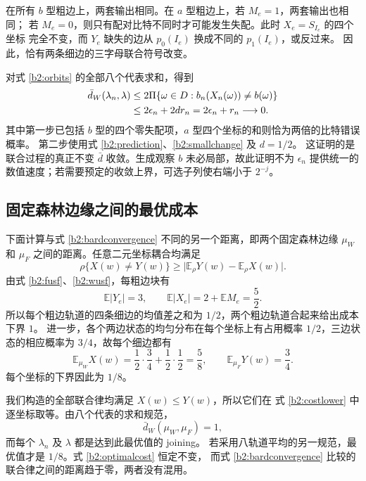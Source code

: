 \documentclass[UTF8,zihao=-4,a4paper]{ctexart}
\numberwithin{equation}{section}
\newcommand{\EE}{\mathbb E}
\begin{document}
在所有 $b$ 型粗边上，两套输出相同。在 $a$ 型粗边上，若 $M_e=1$，两套输出也相同；
若 $M_e=0$，则只有配对比特不同时才可能发生失配。此时 $X_e=S_{I_e}$ 的四个坐标
完全不变，而 $Y_e$ 缺失的边从 $p_0(I_e)$ 换成不同的 $p_1(I_e)$，或反过来。
因此，恰有两条细边的三字母联合符号改变。

对式 \eqref{b2:orbits} 的全部八个代表求和，得到
\begin{align}
 \bar d_W(\lambda_n,\lambda)
 &\le2\Pi\{\omega\in D:b_n(X_n(\omega))\ne b(\omega)\}\notag\\
 &\le2\epsilon_n+2dr_n
 =2\epsilon_n+r_n\longrightarrow0.
 \label{b2:bardconvergence}
\end{align}
其中第一步已包括 $b$ 型的四个零失配项，$a$ 型四个坐标的和则恰为两倍的比特错误概率。
第二步使用式 \eqref{b2:prediction}、\eqref{b2:smallchange} 及 $d=1/2$。
这证明的是联合过程的真正不变 $\bar d$ 收敛。生成观察 $b$ 未必局部，故此证明不为
$\epsilon_n$ 提供统一的数值速度；若需要预定的收敛上界，可选子列使右端小于 $2^{-j}$。

\subsection{固定森林边缘之间的最优成本}\label{b2:optimality}

下面计算与式 \eqref{b2:bardconvergence} 不同的另一个距离，即两个固定森林边缘
$\mu_W$ 和 $\mu_F$ 之间的距离。任意二元坐标耦合均满足
\begin{equation}\label{b2:costlower}
 \rho\{X(w)\ne Y(w)\}
 \ge\bigl|\EE_\rho Y(w)-\EE_\rho X(w)\bigr|.
\end{equation}
由式 \eqref{b2:fusf}、\eqref{b2:wusf}，每粗边块有
\[
 \EE|Y_e|=3,\qquad\EE|X_e|=2+\EE M_e=\frac52.
\]
所以每个粗边轨道的四条细边的均值差之和为 $1/2$，两个粗边轨道合起来给出成本下界 $1$。
进一步，各个两边状态的均匀分布在每个坐标上有占用概率 $1/2$，三边状态的相应概率为
$3/4$，故每个细边都有
\begin{equation}\label{b2:finemarginals}
 \EE_{\mu_W}X(w)=\frac12\cdot\frac34+\frac12\cdot\frac12=\frac58,
 \qquad\EE_{\mu_F}Y(w)=\frac34.
\end{equation}
每个坐标的下界因此为 $1/8$。

我们构造的全部联合律均满足 $X(w)\le Y(w)$，所以它们在
式 \eqref{b2:costlower} 中逐坐标取等。由八个代表的求和规范，
\begin{equation}\label{b2:optimalcost}
 \bar d_W(\mu_W,\mu_F)=1,
\end{equation}
而每个 $\lambda_n$ 及 $\lambda$ 都是达到此最优值的 joining。
若采用八轨道平均的另一规范，最优值才是 $1/8$。式 \eqref{b2:optimalcost} 恒定不变，
而式 \eqref{b2:bardconvergence} 比较的联合律之间的距离趋于零，两者没有混用。
\end{document}
